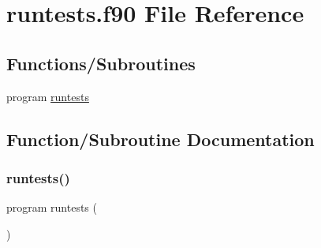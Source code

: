 \hypertarget{runtests_8f90}{}\section{runtests.\+f90 File Reference}
\label{runtests_8f90}
\subsection*{Functions/\+Subroutines}
\begin{DoxyCompactItemize}
\item 
program \hyperlink{runtests_8f90_a21d21b6266558a529915d027eca44ce9}{runtests}
\end{DoxyCompactItemize}


\subsection{Function/\+Subroutine Documentation}
\mbox{\label{runtests_8f90_a21d21b6266558a529915d027eca44ce9}} 
\subsubsection{\texorpdfstring{runtests()}{runtests()}}
{\footnotesize\ttfamily program runtests (\begin{DoxyParamCaption}{ }\end{DoxyParamCaption})}


